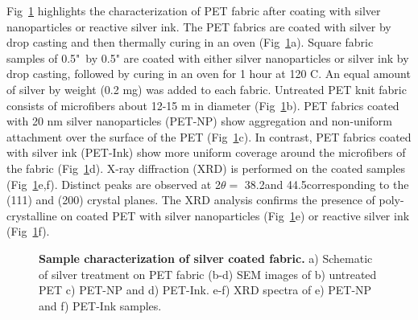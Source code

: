\documentclass[10pt,letterpaper]{article}
\begin{document}
Fig~\ref{fig1} highlights the characterization of PET fabric after coating with silver nanoparticles or reactive silver ink.  
The PET fabrics are coated with silver by drop casting and then thermally curing in an oven %
(Fig~\ref{fig1}a).  Square fabric samples of 
0.5"~by 0.5" are coated with either silver nanoparticles or silver ink by drop casting, followed by curing in an oven for 1 hour at 120 \degree C. An equal amount of silver by weight (0.2 mg) was added to each fabric. 
Untreated PET knit fabric consists of microfibers about 12-15 \micro m in diameter (Fig~\ref{fig1}b). %
PET fabrics coated with 20 nm silver nanoparticles (PET-NP) show aggregation and non-uniform attachment over the surface of the PET (Fig~\ref{fig1}c).  
In contrast, PET fabrics %
coated with silver ink (PET-Ink) 
show more uniform coverage around the microfibers of the fabric (Fig~\ref{fig1}d). 
X-ray diffraction (XRD) is performed on the coated samples (Fig~\ref{fig1}e,f). %
Distinct peaks are observed at 2$\theta =$ 38.2\degree and 44.5\degree corresponding to the (111) and (200) crystal planes. 
The XRD analysis confirms the presence of poly-crystalline on coated PET with silver nanoparticles (Fig~\ref{fig1}e) or reactive silver ink (Fig~\ref{fig1}f). 

\begin{figure}[!h]
\caption{{\bf Sample characterization of silver coated fabric.}
a) Schematic of silver treatment on PET fabric (b-d) SEM images of b) untreated PET c) PET-NP and d) PET-Ink. e-f) XRD spectra of e) PET-NP and f) PET-Ink samples.}
\label{fig1}
\end{figure}

\end{document}
